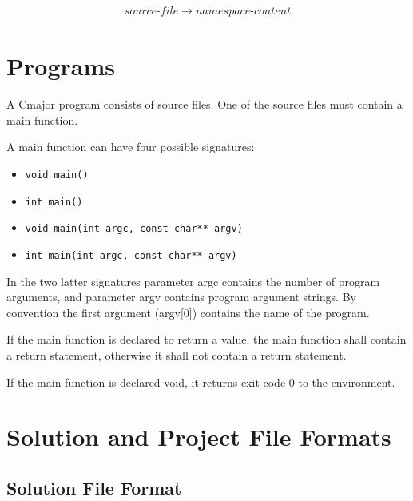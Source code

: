 \documentclass[a4paper,oneside,11pt]{article}
\begin{document}
\begin{align*}
source\textrm{-}file \rightarrow \hyperref[namespacecontent]{namespace\textrm{-}content}
\end{align*}

\section{Programs}

A Cmajor program consists of source files.
One of the source files must contain a main function.

A main function can have four possible signatures:

\begin{itemize}
\item \texttt{void main()}
\item \texttt{int main()}
\item \texttt{void main(int argc, const char** argv)}
\item \texttt{int main(int argc, const char** argv)}
\end{itemize}

In the two latter signatures parameter argc contains the number of program arguments,
and parameter argv contains program argument strings.
By convention the first argument (argv[0]) contains the name of the program.

If the main function is declared to return a value, the main function shall contain
a return statement, otherwise it shall not contain a return statement.

If the main function is declared void, it returns exit code 0 to the environment.

\section{Solution and Project File Formats}

\subsection{Solution File Format}
\end{document}
